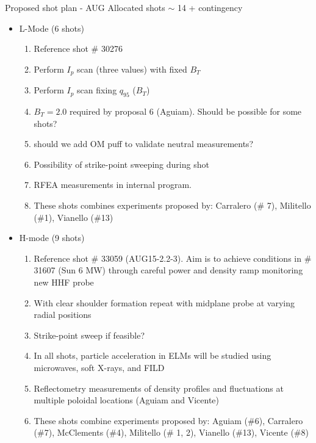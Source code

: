 \documentclass[10pt, compress]{beamer}
\begin{document}
\begin{frame}[allowframebreaks]{Proposed shot plan - AUG}
\vspace{-1cm}
Allocated shots $\sim$ 14 + contingency 
\begin{itemize}
	\item L-Mode (6 shots)
	\begin{enumerate}
		\item Reference shot \# 30276
		\item Perform $I_p$ scan (three values) with fixed $B_T$
		\item Perform $I_p$ scan fixing  $q_{95}$	 ($B_T$)	
		\item $B_T= 2.0$ required by proposal 6 (Aguiam). Should be possible for some shots? 		
		\item should we add OM puff to validate neutral measurements?
		\item Possibility of strike-point sweeping during shot
		\item RFEA measurements in internal program. 
		\item These shots combines experiments proposed by:
                  Carralero (\# 7), Militello (\#1), Vianello (\#13)

	\end{enumerate}
	\item H-mode (9 shots)
	\begin{enumerate}
		\item Reference shot \# 33059 (AUG15-2.2-3). Aim is to achieve conditions
                  in \# 31607 (Sun 6 MW) through careful power and density ramp monitoring new HHF probe 
		\item With clear shoulder formation repeat with midplane probe at varying radial positions 
		\item Strike-point sweep if feasible? 
		\item In all shots, particle acceleration in ELMs will be studied using microwaves,
                  soft X-rays, and FILD 
		\item Reflectometry measurements of density profiles and fluctuations at multiple poloidal locations (Aguiam and Vicente)
		\item These shots combine experiments proposed by:
                  Aguiam (\#6), Carralero (\#7), McClements (\#4),
                  Militello (\# 1, 2), Vianello (\#13), Vicente (\#8)
		
	\end{enumerate}
\end{itemize}
\end{frame}
\end{document}
